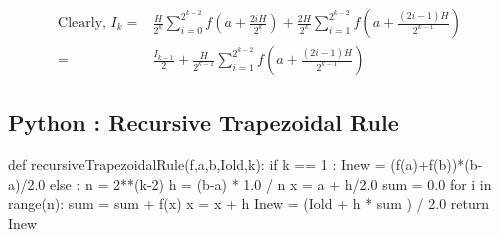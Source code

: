 	\begin{align*}
		\text{Clearly, }I_k = & \frac{H}{2^k} \sum_{i=0}^{2^{k-2}} f\left(a+\frac{2iH}{2^k}\right) + \frac{2H}{2^k} \sum_{i=1}^{2^{k-2}} f\left(a+\frac{(2i-1)H}{2^{k-1}}\right) \\
		= & \frac{I_{k-1}}{2} + \frac{H}{2^{k-1}} \sum_{i=1}^{2^{k-2}} f\left(a+\frac{(2i-1)H}{2^{k-1}}\right)
	\end{align*}

\subsection{Python : Recursive Trapezoidal Rule}
\begin{program}
	\begin{python}
		def recursiveTrapezoidalRule(f,a,b,Iold,k):
			if k == 1 :
				Inew = (f(a)+f(b))*(b-a)/2.0
			else :
				n = 2**(k-2)
				h = (b-a) * 1.0 / n
				x = a + h/2.0
				sum = 0.0
				for i in range(n):
					sum = sum + f(x)
					x = x + h
				Inew = (Iold + h * sum ) / 2.0
			return Inew
	\end{python}
\end{program}
